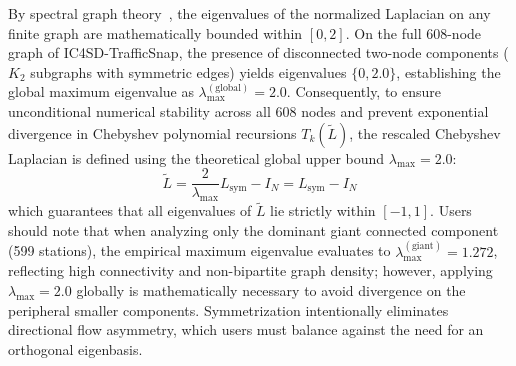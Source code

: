 \documentclass[preprint,12pt]{elsarticle}
\begin{document}
By spectral graph theory~\cite{chung1997spectral}, the eigenvalues of the normalized Laplacian on any finite graph are mathematically bounded within $[0, 2]$. On the full 608-node graph of IC4SD-TrafficSnap, the presence of disconnected two-node components ($K_2$ subgraphs with symmetric edges) yields eigenvalues $\{0, 2.0\}$, establishing the global maximum eigenvalue as $\lambda_{\max}^{(\text{global})} = 2.0$. Consequently, to ensure unconditional numerical stability across all 608 nodes and prevent exponential divergence in Chebyshev polynomial recursions $T_k(\tilde{L})$, the rescaled Chebyshev Laplacian is defined using the theoretical global upper bound $\lambda_{\max} = 2.0$:
\begin{equation}
    \tilde{L} = \frac{2}{\lambda_{\max}} L_{\text{sym}} - I_N = L_{\text{sym}} - I_N
\end{equation}
which guarantees that all eigenvalues of $\tilde{L}$ lie strictly within $[-1, 1]$. Users should note that when analyzing only the dominant giant connected component (599 stations), the empirical maximum eigenvalue evaluates to $\lambda_{\max}^{(\text{giant})} = 1.272$, reflecting high connectivity and non-bipartite graph density; however, applying $\lambda_{\max} = 2.0$ globally is mathematically necessary to avoid divergence on the peripheral smaller components. Symmetrization intentionally eliminates directional flow asymmetry, which users must balance against the need for an orthogonal eigenbasis.
\end{document}
